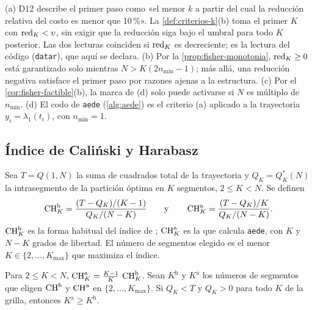 \begin{observacion}\label{obs:criterios-k}
(a) D12 describe el primer paso como «el menor $k$ a partir del cual la reducción relativa del
costo es menor que 10\,\%». La \cref{def:criterios-k}(b) toma el primer $K$ con $\operatorname{red}_K<\upsilon$,
sin exigir que la reducción siga bajo el umbral para todo $K$ posterior. Las dos lecturas
coinciden si $\operatorname{red}_K$ es decreciente; es la lectura del código (\texttt{datar}), que aquí se
declara. (b) Por la \cref{prop:fisher-monotonia}, $\operatorname{red}_K\ge0$ está garantizado solo mientras
$N>K(2n_{\min}-1)$; más allá, una reducción negativa satisface el primer paso por razones
ajenas a la estructura. (c) Por el \cref{cor:fisher-factible}(b), la marca de (d) solo puede
activarse si $N$ es múltiplo de $n_{\min}$. (d) El codo de \texttt{aede} (\cref{alg:aede}) es el
criterio (a) aplicado a la trayectoria $y_i=\lambda_1(t_i)$, con $n_{\min}=1$.
\end{observacion}

\subsection{Índice de Caliński y Harabasz}

\begin{definicion}\label{def:ch}
Sea $T=Q(1,N)$ la suma de cuadrados total de la trayectoria y $Q_K=Q^\ast_K(N)$ la intrasegmento
de la partición óptima en $K$ segmentos, $2\le K<N$. Se definen
\[
  \operatorname{CH}^{\mathrm h}_K=\frac{(T-Q_K)/(K-1)}{Q_K/(N-K)}
  \qquad\text{y}\qquad
  \operatorname{CH}^{\mathrm a}_K=\frac{(T-Q_K)/K}{Q_K/(N-K)} .
\]
$\operatorname{CH}^{\mathrm h}_K$ es la forma habitual del índice de
\textcite{calinski_harabasz_1974}; $\operatorname{CH}^{\mathrm a}_K$ es la que calcula
\texttt{aede}, con $K$ y $N-K$ grados de libertad. El número de segmentos elegido es el menor
$K\in\{2,\dots,K_{\max}\}$ que maximiza el índice.
\end{definicion}

\begin{proposicion}\label{prop:ch}
Para $2\le K<N$, $\operatorname{CH}^{\mathrm a}_K=\frac{K-1}{K}\,\operatorname{CH}^{\mathrm h}_K$. Sean $K^{\mathrm h}$ y
$K^{\mathrm a}$ los números de segmentos que eligen $\operatorname{CH}^{\mathrm h}$ y $\operatorname{CH}^{\mathrm a}$ en
$\{2,\dots,K_{\max}\}$. Si $Q_K<T$ y $Q_K>0$ para todo $K$ de la grilla, entonces
$K^{\mathrm a}\ge K^{\mathrm h}$.
\end{proposicion}

